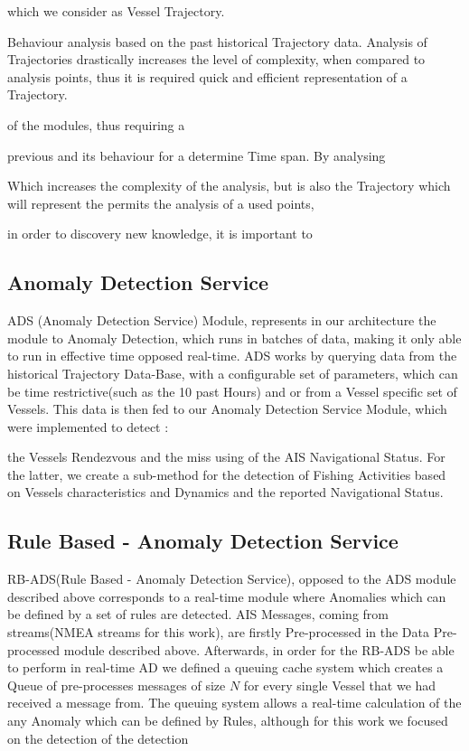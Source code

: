 which we consider as Vessel Trajectory. 

Behaviour analysis based on the past historical Trajectory data. Analysis of Trajectories drastically increases the level of complexity, when compared to analysis points, thus it is required quick and efficient representation of a Trajectory.


of the modules, thus requiring a 

previous  and its behaviour for a determine Time span. By analysing   

Which increases the complexity of the analysis, but is also the 
Trajectory which will represent the   permits the analysis of a used points,   


in order to discovery new knowledge, it is important to 


\subsection{Anomaly Detection Service}
ADS (Anomaly Detection Service) Module, represents in our architecture the module to Anomaly Detection, which runs in batches of data, making it only able to run in effective time opposed real-time. ADS works by querying data from the historical Trajectory Data-Base, with a configurable set of parameters, which can be time restrictive(such as the 10 past Hours) and or from a Vessel specific set of Vessels. This data is then fed to our Anomaly Detection Service Module, which were implemented to detect :

the Vessels Rendezvous and the miss using of the AIS Navigational Status.
For the latter, we create a sub-method for the detection of Fishing Activities based on Vessels characteristics and Dynamics and the reported Navigational Status.


\subsection{Rule Based - Anomaly Detection Service}
RB-ADS(Rule Based - Anomaly Detection Service), opposed to the ADS module described above corresponds to a real-time module where Anomalies which can be defined by a set of rules are detected.
AIS Messages, coming from streams(NMEA streams for this work), are firstly Pre-processed in the Data Pre-processed module described above. Afterwards, in order for the RB-ADS be able to perform in real-time AD we defined a queuing cache system which creates a Queue of pre-processes messages of size $N$ for every single Vessel that we had received a message from. 
The queuing system allows a real-time calculation of the any Anomaly which can be defined by Rules, although for this work we focused on the detection of the detection    

